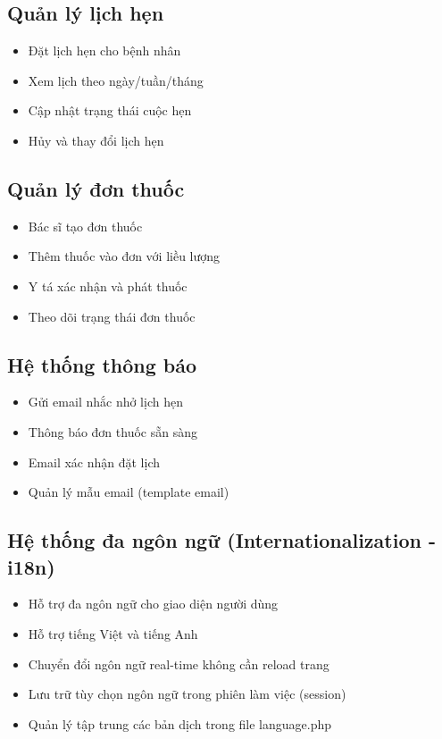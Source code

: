 \documentclass[12pt,a4paper]{report}
\begin{document}
\subsection{Quản lý lịch hẹn}
\begin{itemize}
    \item Đặt lịch hẹn cho bệnh nhân
    \item Xem lịch theo ngày/tuần/tháng
    \item Cập nhật trạng thái cuộc hẹn
    \item Hủy và thay đổi lịch hẹn
\end{itemize}

\subsection{Quản lý đơn thuốc}
\begin{itemize}
    \item Bác sĩ tạo đơn thuốc
    \item Thêm thuốc vào đơn với liều lượng
    \item Y tá xác nhận và phát thuốc
    \item Theo dõi trạng thái đơn thuốc
\end{itemize}

\subsection{Hệ thống thông báo}
\begin{itemize}
    \item Gửi email nhắc nhở lịch hẹn
    \item Thông báo đơn thuốc sẵn sàng
    \item Email xác nhận đặt lịch
    \item Quản lý mẫu email (template email)
\end{itemize}

\subsection{Hệ thống đa ngôn ngữ (Internationalization - i18n)}
\begin{itemize}
    \item Hỗ trợ đa ngôn ngữ cho giao diện người dùng
    \item Hỗ trợ tiếng Việt và tiếng Anh
    \item Chuyển đổi ngôn ngữ real-time không cần reload trang
    \item Lưu trữ tùy chọn ngôn ngữ trong phiên làm việc (session)
    \item Quản lý tập trung các bản dịch trong file language.php
\end{itemize}
\end{document}
